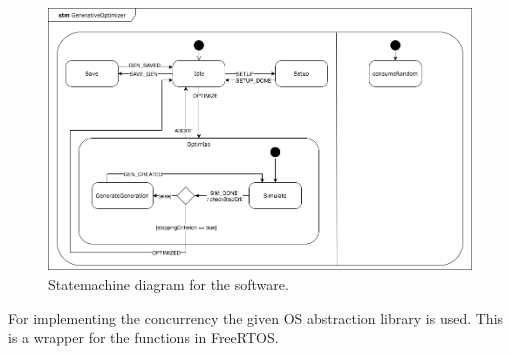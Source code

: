 \begin{figure}[htbp]
\begin{centering}
\includegraphics[width=0.9\linewidth]{../diagrams/statemachine.png}
\caption{Statemachine diagram for the software.}
\label{fig:statemachine}
\end{centering}
\end{figure}

For implementing the concurrency the given OS abstraction library is used. This is a wrapper for the functions in FreeRTOS.


